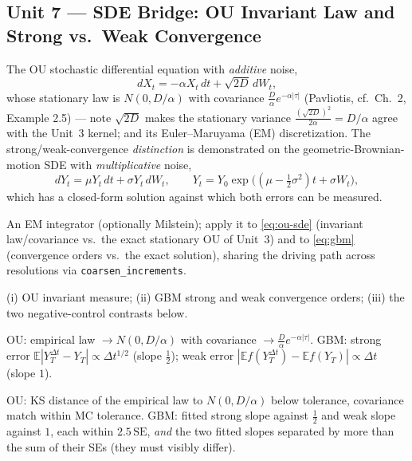 \documentclass[11pt]{article}
\newcommand{\pav}[1]{{\small\color{hubblue}(Pavliotis, #1)}}
\newenvironment{unitmeta}{%
  \begin{description}[style=sameline,leftmargin=1.4cm,font=\bfseries\color{hubblue}]
}{%
  \end{description}
}
\begin{document}
\subsection*{Unit 7 --- SDE Bridge: OU Invariant Law and Strong vs.\ Weak Convergence}
\begin{unitmeta}
\item[Concept] The OU stochastic differential equation with \emph{additive} noise,
\begin{equation}
dX_t = -\alpha X_t\,dt + \sqrt{2D}\,dW_t,
\label{eq:ou-sde}
\end{equation}
whose stationary law is $N(0,D/\alpha)$ with covariance $\tfrac{D}{\alpha}e^{-\alpha|\tau|}$ \pav{cf.\ Ch.~2, Example 2.5} --- note $\sqrt{2D}$ makes the stationary variance $\tfrac{(\sqrt{2D})^2}{2\alpha}=D/\alpha$ agree with the Unit~3 kernel; and its Euler--Maruyama (EM) discretization. The strong/weak-convergence \emph{distinction} is demonstrated on the geometric-Brownian-motion SDE with \emph{multiplicative} noise,
\begin{equation}
dY_t = \mu Y_t\,dt + \sigma Y_t\,dW_t, \qquad Y_t = Y_0\exp\!\big((\mu-\tfrac12\sigma^2)t + \sigma W_t\big),
\label{eq:gbm}
\end{equation}
which has a closed-form solution against which both errors can be measured.
\item[Build] An EM integrator (optionally Milstein); apply it to \eqref{eq:ou-sde} (invariant law/covariance vs.\ the exact stationary OU of Unit~3) and to \eqref{eq:gbm} (convergence orders vs.\ the exact solution), sharing the driving path across resolutions via \texttt{coarsen\_increments}.
\item[Check] (i) OU invariant measure; (ii) GBM strong and weak convergence orders; (iii) the two negative-control contrasts below.
\item[Analytic target] OU: empirical law $\to N(0,D/\alpha)$ with covariance $\to\frac{D}{\alpha}e^{-\alpha|\tau|}$. GBM: strong error $\mathbb{E}|Y^{\Delta t}_T-Y_T| \propto \Delta t^{1/2}$ (slope $\tfrac12$); weak error $|\mathbb{E}f(Y_T^{\Delta t})-\mathbb{E}f(Y_T)| \propto \Delta t$ (slope $1$).
\item[Pass/fail] OU: KS distance of the empirical law to $N(0,D/\alpha)$ below tolerance, covariance match within MC tolerance. GBM: fitted strong slope against $\tfrac12$ and weak slope against $1$, each within $2.5\,\mathrm{SE}$, \emph{and} the two fitted slopes separated by more than the sum of their SEs (they must visibly differ).

\end{unitmeta}
\end{document}
